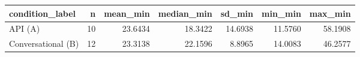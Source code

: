 \begin{tabular}{lrrrrrr}
\toprule
   condition_label &  n &  mean_min &  median_min &  sd_min &  min_min &  max_min \\
\midrule
           API (A) & 10 &   23.6434 &     18.3422 & 14.6938 &  11.5760 &  58.1908 \\
Conversational (B) & 12 &   23.3138 &     22.1596 &  8.8965 &  14.0083 &  46.2577 \\
\bottomrule
\end{tabular}
